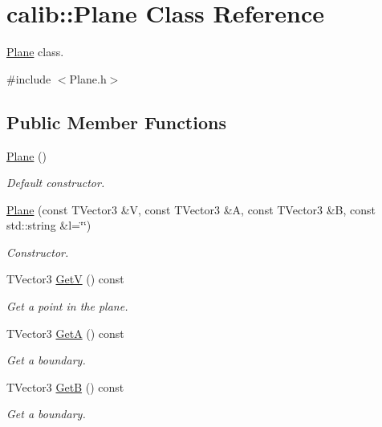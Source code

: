 \hypertarget{classcalib_1_1Plane}{\section{calib\-:\-:Plane Class Reference}
\label{classcalib_1_1Plane}
}


\hyperlink{classcalib_1_1Plane}{Plane} class.  




{\ttfamily \#include $<$Plane.\-h$>$}

\subsection*{Public Member Functions}
\begin{DoxyCompactItemize}
\item 
\hyperlink{classcalib_1_1Plane_a110f0a87fc58db42b3cf49c907b9a524}{Plane} ()
\begin{DoxyCompactList}\small\item\em Default constructor. \end{DoxyCompactList}\item 
\hyperlink{classcalib_1_1Plane_a5dedbdde7cfed3c62e0cd9a95cc1caf3}{Plane} (const T\-Vector3 \&V, const T\-Vector3 \&A, const T\-Vector3 \&B, const std\-::string \&l=\char`\"{}\char`\"{})
\begin{DoxyCompactList}\small\item\em Constructor. \end{DoxyCompactList}\item 
T\-Vector3 \hyperlink{classcalib_1_1Plane_a30e4c2891270c69e565e4e5baf7ffaf8}{Get\-V} () const 
\begin{DoxyCompactList}\small\item\em Get a point in the plane. \end{DoxyCompactList}\item 
T\-Vector3 \hyperlink{classcalib_1_1Plane_a1853ae99310b7a9b6c83eb0aa322570d}{Get\-A} () const 
\begin{DoxyCompactList}\small\item\em Get a boundary. \end{DoxyCompactList}\item 
T\-Vector3 \hyperlink{classcalib_1_1Plane_a2e26ce75b69a06b3cdf075201f658070}{Get\-B} () const 
\begin{DoxyCompactList}\small\item\em Get a boundary. \end{DoxyCompactList}\item 

\end{DoxyCompactItemize}
